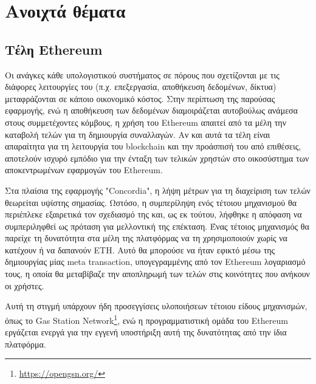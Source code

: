 \section{Ανοιχτά θέματα}\label{section:5-4-open-areas}

\subsection{Τέλη Ethereum}\label{subsection:5-4-1-ethereum-fees}

Οι ανάγκες κάθε υπολογιστικού συστήματος σε πόρους που σχετίζονται με τις διάφορες λειτουργίες του (π.χ. επεξεργασία, αποθήκευση δεδομένων, δίκτυα) μεταφράζονται σε κάποιο οικονομικό κόστος. Στην περίπτωση της παρούσας εφαρμογής, ενώ η αποθήκευση των δεδομένων διαμοιράζεται αυτοβούλως ανάμεσα στους συμμετέχοντες κόμβους, η χρήση του Ethereum απαιτεί από τα μέλη την καταβολή τελών για τη δημιουργία συναλλαγών. Αν και αυτά τα τέλη είναι απαραίτητα για τη λειτουργία του blockchain και την προάσπισή του από επιθέσεις, αποτελούν ισχυρό εμπόδιο για την ένταξη των τελικών χρηστών στο οικοσύστημα των αποκεντρωμένων εφαρμογών του Ethereum.

Στα πλαίσια της εφαρμογής "Concordia", η λήψη μέτρων για τη διαχείριση των τελών θεωρείται υψίστης σημασίας. Ωστόσο, η συμπερίληψη ενός τέτοιου μηχανισμού θα περιέπλεκε εξαιρετικά τον σχεδιασμό της και, ως εκ τούτου, λήφθηκε η απόφαση να συμπεριληφθεί ως πρόταση για μελλοντική της επέκταση. Ένας τέτοιος μηχανισμός θα παρείχε τη δυνατότητα στα μέλη της πλατφόρμας να τη χρησιμοποιούν χωρίς να κατέχουν ή να δαπανούν ETH. Αυτό θα μπορούσε να ήταν εφικτό μέσω της δημιουργίας μίας meta transaction, υπογεγραμμένης από τον Ethereum λογαριασμό τους, η οποία θα μεταβίβαζε την αποπληρωμή των τελών στις κοινότητες που ανήκουν οι χρήστες.

Αυτή τη στιγμή υπάρχουν ήδη προσεγγίσεις υλοποιήσεων τέτοιου είδους μηχανισμών, όπως το Gas Station Network\footnote{\url{https://opengsn.org/}}, ενώ η προγραμματιστική ομάδα του Ethereum εργάζεται ενεργά για την εγγενή υποστήριξη αυτή της δυνατότητας από την ίδια πλατφόρμα.

